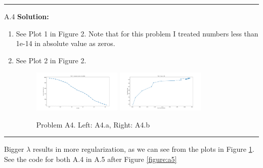 \documentclass{article}
\newcommand{\1}{\mathbf{1}}
\begin{document}
\noindent\rule{\textwidth}{1pt}
A.4 {\bf Solution:}\\
\begin{enumerate}
    \item See Plot 1 in Figure 2. Note that for this problem I treated numbers less than 1e-14 in absolute value as zeros.
    \item See Plot 2 in Figure 2. 
        \begin{figure}[h!]
            \centering
            \includegraphics[width=0.4\textwidth]{hw2/code/figures/A4a.pdf}
            \includegraphics[width=0.4\textwidth]{hw2/code/figures/A4b.pdf}
            \caption{Problem A4. Left: A4.a, Right: A4.b}
            \label{figure:a4}
        \end{figure}


\end{enumerate}
\noindent\rule{\textwidth}{1pt}
Bigger $\lambda$ results in more regularization, as we can see from the plots in Figure \ref{figure:a4}. See the code for both A.4 in A.5 after Figure \ref{figure:a5}
\end{document}
